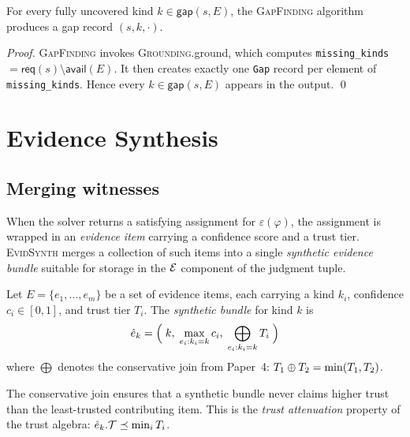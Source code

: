 \documentclass[11pt]{article}
\newcommand{\Enc}{\varepsilon}               %
\newcommand{\GroundAlg}{\textsc{Grounding}}  %
\newcommand{\GapAlg}{\textsc{GapFinding}}    %
\newcommand{\EvidAlg}{\textsc{EvidSynth}}    %
\newcommand{\Avail}{\mathsf{avail}}          %
\newcommand{\Req}{\mathsf{req}}              %
\newcommand{\Gap}{\mathsf{gap}}              %
\begin{document}
\begin{theorem}\label{thm:gap-completeness}
For every fully uncovered kind $k \in \Gap(s, E)$, the
\GapAlg{} algorithm produces a gap record $(s, k, \cdot)$.
\end{theorem}
\begin{proof}
\GapAlg{} invokes \GroundAlg{}.ground, which computes
\texttt{missing\_kinds} $= \Req(s) \setminus \Avail(E)$.
It then creates exactly one \texttt{Gap} record per element
of \texttt{missing\_kinds}.
Hence every $k \in \Gap(s, E)$ appears in the output.
\qed
\end{proof}

\section{Evidence Synthesis}\label{sec:evid}

\subsection{Merging witnesses}

When the solver returns a satisfying assignment for
$\Enc(\varphi)$, the assignment is wrapped in an
\emph{evidence item} carrying a confidence score and a trust tier.
\EvidAlg{} merges a collection of such items into a single
\emph{synthetic evidence bundle} suitable for storage in the
$\mathcal{E}$ component of the judgment tuple.

\begin{definition}\label{def:evid-synth}
Let $E = \{e_1, \ldots, e_m\}$ be a set of evidence items,
each carrying a kind $k_i$, confidence $c_i \in [0,1]$, and
trust tier $T_i$.
The \emph{synthetic bundle} for kind $k$ is
\[
  \hat{e}_k = \Bigl(\;k,\;
    \max_{e_i : k_i = k} c_i,\;
    \bigoplus_{e_i : k_i = k} T_i\;\Bigr)
\]
where $\bigoplus$ denotes the conservative join from Paper~4:
$T_1 \oplus T_2 = \min(T_1, T_2)$.
\end{definition}

\begin{remark}
The conservative join ensures that a synthetic bundle never
claims higher trust than the least-trusted contributing item.
This is the \emph{trust attenuation} property of the trust
algebra: $\hat{e}_k.\mathcal{T} \preceq \min_i T_i$.
\end{remark}
\end{document}
